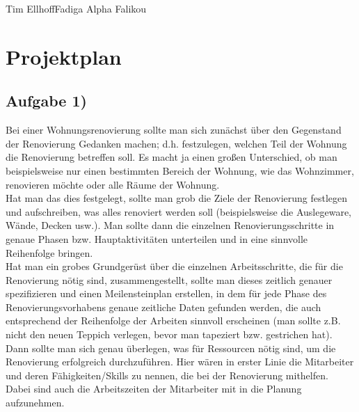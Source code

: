 \documentclass{swp1}
\begin{document}
          {Tim Ellhoff}{Fadiga Alpha Falikou}{}

\section*{Projektplan}          
\subsection*{Aufgabe 1)}
Bei einer Wohnungsrenovierung sollte man sich zunächst über den Gegenstand der Renovierung Gedanken machen; d.h. festzulegen, welchen Teil der Wohnung die Renovierung betreffen soll. Es macht ja einen großen Unterschied, ob man beispielsweise nur einen bestimmten Bereich der Wohnung, wie das Wohnzimmer, renovieren möchte oder alle Räume der Wohnung. \\
Hat man das dies festgelegt, sollte man grob die Ziele der Renovierung festlegen und aufschreiben, was alles renoviert werden soll (beispielsweise die Auslegeware, Wände, Decken usw.).
Man sollte dann die einzelnen Renovierungsschritte in genaue Phasen bzw. Hauptaktivitäten unterteilen und in eine sinnvolle Reihenfolge bringen.\\
Hat man ein grobes Grundgerüst über die einzelnen Arbeitsschritte, die für die Renovierung nötig sind, zusammengestellt, sollte man dieses zeitlich genauer spezifizieren und einen Meilensteinplan erstellen, in dem für jede Phase des Renovierungsvorhabens genaue zeitliche Daten gefunden werden, die auch entsprechend der Reihenfolge der Arbeiten sinnvoll erscheinen (man sollte z.B. nicht den neuen Teppich verlegen, bevor man tapeziert bzw. gestrichen hat). \\

Dann sollte man sich genau überlegen, was für Ressourcen nötig sind, um die Renovierung erfolgreich durchzuführen. Hier wären in erster Linie die Mitarbeiter und deren Fähigkeiten/Skills zu nennen, die bei der Renovierung mithelfen. Dabei sind auch die Arbeitszeiten der Mitarbeiter mit in die Planung aufzunehmen. \\
\end{document}
